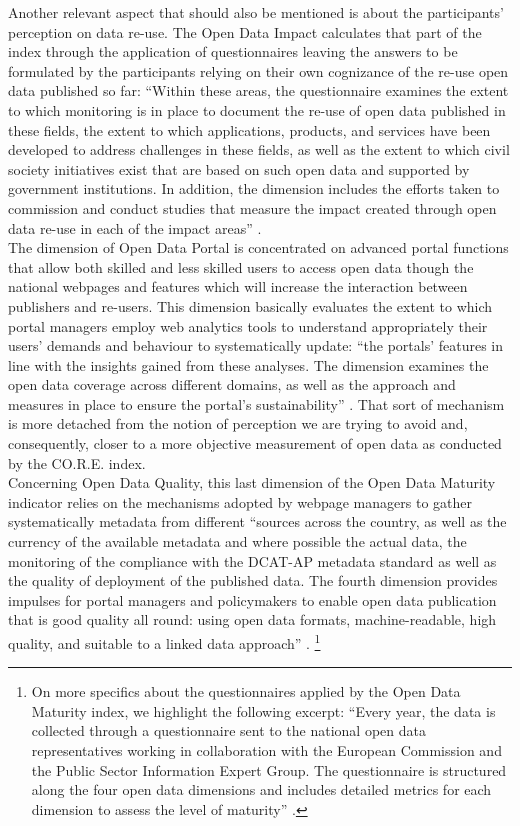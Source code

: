 \documentclass[a4paper, twoside]{report}
\let\oldfootnote\footnote
\renewcommand\footnote[1]{%
\oldfootnote{\hspace{2mm}#1}}
\begin{document}
Another relevant aspect that should also be mentioned is about the participants' perception on data re-use. The Open Data Impact calculates that part of the index through the application of questionnaires leaving the answers to be formulated by the participants relying on their own cognizance of the re-use open data published so far: ``Within these areas, the questionnaire examines the extent to which monitoring is in place to document the re-use of open data published in these fields, the extent to which applications, products, and services have been developed to address challenges in these fields, as well as the extent to which civil society initiatives exist that are based on such open data and supported by government institutions. In addition, the dimension includes the efforts taken to commission and conduct studies that measure the impact created through open data re-use in each of the impact areas'' \citep[p. 9]{open_data_maturity}.\\

The dimension of Open Data Portal is concentrated on advanced portal functions that allow both skilled and less skilled users to access open data though the national webpages and features which will increase the interaction between publishers and re-users. This dimension basically evaluates the extent to which portal managers employ web analytics tools to understand appropriately their users’ demands and behaviour to systematically update: ``the portals’ features in line with the insights gained from these analyses. The dimension examines the open data coverage across different domains, as well as the approach and measures in place to ensure the portal’s sustainability'' \citep[p. 9]{open_data_maturity}. That sort of mechanism is more detached from the notion of perception we are trying to avoid and, consequently, closer to a more objective measurement of open data as conducted by the CO.R.E. index.\\

Concerning Open Data Quality, this last dimension of the Open Data Maturity indicator relies on the mechanisms adopted by webpage managers to gather systematically metadata from different ``sources across the country, as well as the currency of the available metadata and where possible the actual data, the monitoring of the compliance with the DCAT-AP metadata standard as well as the quality of deployment of the published data. The fourth dimension provides impulses for portal managers and policymakers to enable open data publication that is good quality all round: using open data formats, machine-readable, high quality, and suitable to a linked data approach'' \citep[p. 10]{open_data_maturity}.\footnote{On more specifics about the questionnaires applied by the Open Data Maturity index, we highlight the following excerpt: ``Every year, the data is collected through a questionnaire sent to the national open data representatives working in collaboration with the European Commission and the Public Sector Information Expert Group. The questionnaire is structured along the four open data dimensions and includes detailed metrics for each dimension to assess the level of maturity'' \citep[p. 9]{open_data_maturity}.}\\
\end{document}

